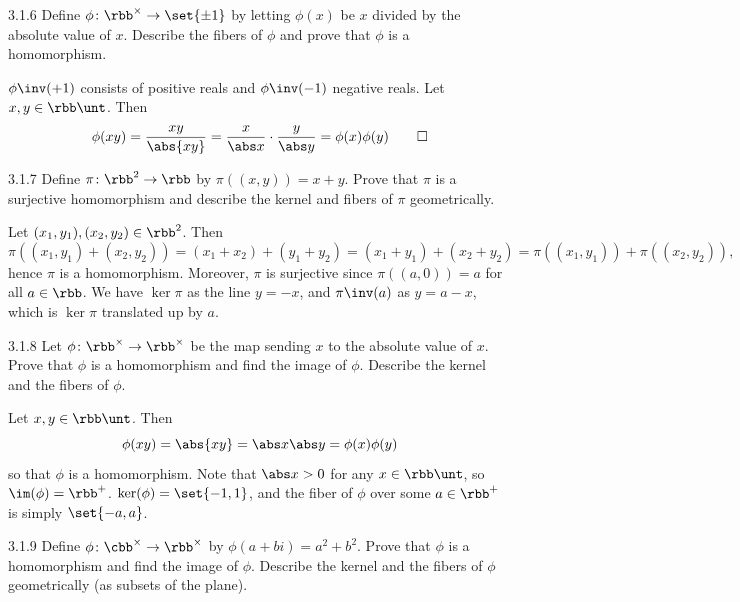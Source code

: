 \begin{exercise}{3.1.6}
    Define $\phi \colon \rbb^{\times} \to \set{\pm 1}$ by letting $\phi(x)$ be $x$ divided by the absolute value of $x$.
	Describe the fibers of $\phi$ and prove that $\phi$ is a homomorphism.
\end{exercise}

\begin{sol}
    $\phi\inv(+1)$ consists of positive reals and $\phi\inv(-1)$ negative reals.
	Let $x, y \in \rbb\unt$.
	Then
    \[
    	\phi(xy) = \frac{xy}{\abs{xy}} = \frac{x}{\abs x} \cdot \frac{y}{\abs y} = \phi(x)\phi(y) \qedhere
    \]
\end{sol}

\begin{exercise}{3.1.7}
    Define $\pi \colon \rbb^2 \to \rbb$ by $\pi((x,y)) = x + y$.
	Prove that $\pi$ is a surjective homomorphism and describe the kernel and fibers of $\pi$ geometrically.
\end{exercise}

\begin{sol}
    Let $(x_1, y_1), (x_2, y_2) \in \rbb^2$.
	Then
    \[
    	\pi((x_1, y_1) + (x_2, y_2)) = (x_1 + x_2) + (y_1 + y_2) = (x_1 + y_1) + (x_2 + y_2) = \pi((x_1, y_1)) + \pi((x_2, y_2)),
    \]
    hence $\pi$ is a homomorphism.
	Moreover, $\pi$ is surjective since $\pi((a, 0)) = a$ for all $a \in \rbb$.
	We have $\ker\pi$ as the line $y = -x$, and $\pi\inv(a)$ as $y = a - x$, which is $\ker\pi$ translated up by $a$.
\end{sol}

\begin{exercise}{3.1.8}
    Let $\phi \colon \rbb^{\times} \to \rbb^{\times}$ be the map sending $x$ to the absolute value of $x$.
	Prove that $\phi$ is a homomorphism and find the image of $\phi$.
	Describe the kernel and the fibers of $\phi$.
\end{exercise}

\begin{sol}
    Let $x, y \in \rbb\unt$.
	Then
    \[
    	\phi(xy) = \abs{xy} = \abs x \abs y = \phi(x)\phi(y)
    \]
    so that $\phi$ is a homomorphism.
	Note that $\abs x > 0$ for any $x \in \rbb\unt$, so $\im(\phi) = \rbb^+$. $\ker(\phi) = \set{-1, 1}$, and the fiber of $\phi$ over some $a \in \rbb^+$ is simply $\set{-a, a}$.
\end{sol}

\begin{exercise}{3.1.9}
    Define $\phi \colon \cbb^{\times} \to \rbb^{\times}$ by $\phi(a+bi) = a^2 + b^2$.
	Prove that $\phi$ is a homomorphism and find the image of $\phi$.
	Describe the kernel and the fibers of $\phi$ geometrically (as subsets of the plane).
\end{exercise}

